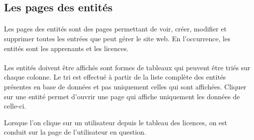 \subsection{Les pages des entités}
\label{subsec:entities-pages}

\paragraph{}
Les pages des entités sont des pages permettant de voir, créer, modifier et supprimer toutes les entrées que peut gérer le site web.
En l'occurrence, les entités sont les apprenants et les licences.

\paragraph{}
Les entités doivent être affichés sont formes de tableaux qui peuvent être triés sur chaque colonne.
Le tri est effectué à partir de la liste complète des entités présentes en base de données et pas uniquement celles qui sont affichées.
Cliquer sur une entité permet d'ouvrir une page qui affiche uniquement les données de celle-ci.

Lorsque l'on clique sur un utilisateur depuis le tableau des licences, on est conduit sur la page de l'utilisateur en question.
